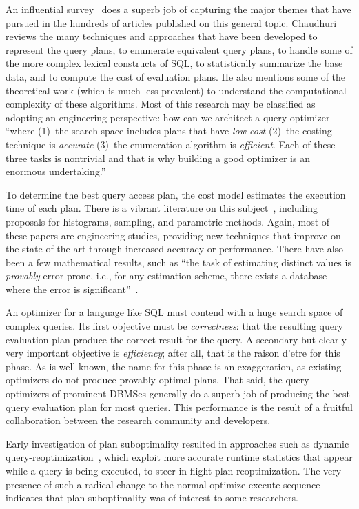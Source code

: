 \documentclass[prodmode,acmtods]{acmsmall}
\begin{document}
An influential survey~\cite{Chaudhuri98} does a superb job of
capturing the major themes that have pursued in the hundreds of articles
published on this general topic. Chaudhuri reviews the many techniques and
approaches that have been developed to represent the query plans, to
enumerate equivalent query plans, to handle some of the more complex lexical
constructs of SQL, to statistically summarize the base data, and to compute the
cost of evaluation plans. He also mentions some of the theoretical work
(which is much less prevalent) to understand the computational complexity of
these algorithms. Most of this research may be classified as adopting an
engineering perspective: how can we architect a query optimizer ``where 
(1)~the search space includes plans that have {\em low cost} (2)~the costing
technique is {\em accurate} (3)~the enumeration algorithm is {\em
  efficient}. Each of these three tasks is nontrivial and that is why
building a good optimizer is an enormous undertaking.'' \cite[page~35]{Chaudhuri98}


To determine the best query access plan, the cost model estimates the
execution time of each plan. There is a vibrant literature on this
subject~\hbox{\cite{Ioannidis03,Mannino88}}, including proposals for
histograms, sampling, and parametric methods. Again, most of these papers
are engineering studies, providing new techniques that improve on the
state-of-the-art through increased accuracy or performance. There have also
been a few mathematical results, such as ``the task of estimating distinct
values is {\em provably} error prone, i.e., for any estimation scheme, there
exists a database where the error is significant''~\cite{Chaudhuri98}.

An optimizer for a language like SQL must contend with a huge search space of
complex queries. Its first objective must be {\em correctness}: that the
resulting query evaluation plan produce the correct result for the
query. A secondary but clearly very important objective is {\em efficiency}; after
all, that is the raison d'etre for this phase. As is well known, the name
for this phase is an exaggeration, as existing optimizers do not produce
provably optimal plans. That said, the
query optimizers of prominent \hbox{DBMSes} generally do a superb job of producing
the best query evaluation plan for most queries. This performance is the
result of a fruitful collaboration between the research community and
developers.

Early investigation of plan suboptimality resulted in approaches such as
dynamic query-reoptimization~\cite{Avnur,kabra98}, which exploit more
accurate runtime statistics that appear while a query is being executed, to
steer in-flight plan reoptimization. The very presence of such a radical
change to the normal optimize-execute sequence indicates that plan
suboptimality was of interest to some researchers.
\end{document}
